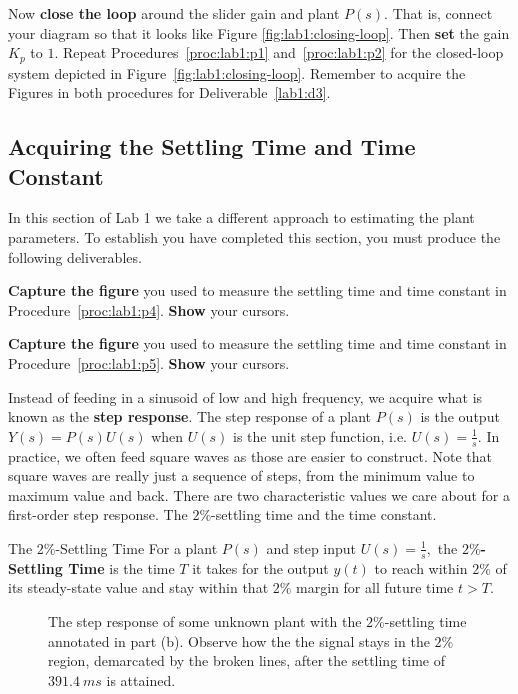 %
\begin{procedure}[label={proc:lab1:p3}]
  Now \textbf{close the loop} around the slider gain and plant \(P(s).\) That
  is, connect your diagram so that it looks like Figure
  \ref{fig:lab1:closing-loop}. Then \textbf{set} the gain \(K_p\) to
  \(1.\)
  Repeat Procedures~\ref{proc:lab1:p1} and~\ref{proc:lab1:p2} for the
  closed-loop system depicted in Figure~\ref{fig:lab1:closing-loop}.
  Remember to acquire the Figures in both procedures for Deliverable~\ref{lab1:d3}.
\end{procedure}

\subsection{Acquiring the Settling Time and Time Constant}
In this section of Lab 1 we take a different approach to estimating the plant
parameters.
To establish you have completed this section, you must produce the following deliverables.
%
\begin{deliverable}[label={lab1:d4}]
  \textbf{Capture the figure} you used to measure the settling time and
  time constant in Procedure~\ref{proc:lab1:p4}. \textbf{Show} your cursors.
\end{deliverable}
%
\begin{deliverable}[label={lab1:d5}]
  \textbf{Capture the figure} you used to measure the settling time and
  time constant in Procedure~\ref{proc:lab1:p5}. \textbf{Show} your cursors.
\end{deliverable}
%
Instead of feeding in a sinusoid of low and high frequency, we
acquire what is known as the \textbf{step response}. The step response of
a plant \(P(s)\) is the output \(Y(s) = P(s) U(s)\) when \(U(s)\) is the unit
step function, i.e. \(U(s) = \frac{1}{s}.\) In practice, we often feed
square waves as those are easier to construct. Note that square waves are
really just a sequence of steps, from the minimum value to maximum value and
back.
%
There are two characteristic values we care about for a first-order step
response. The \(2\%\)-settling time and the time constant.
\begin{definition}[]{The \(2\%\)-Settling Time}
  For a plant \(P(s)\) and step input \(U(s) = \frac{1}{s},\)
  the \textbf{\(2\%\)-Settling Time} is the time \(T\) it takes for
  the output \(y(t)\) to reach within \(2\%\) of its steady-state value and
  stay within that \(2\%\) margin for all future time \(t > T.\)
\end{definition}
%
\begin{figure}
  \centering
  \hfill
  \caption[Step Response for a Linear Plant depicting Settling Time Measurements]{
    The step response of some unknown plant with the \(2\%\)-settling time
    annotated in part (b). Observe how the the signal stays in
    the \(2\%\) region, demarcated by the broken lines,
    after the settling time of \(\SI{391.4}{ms}\) is attained.
  }
  \label{fig:lab1:settling-time}
\end{figure}
